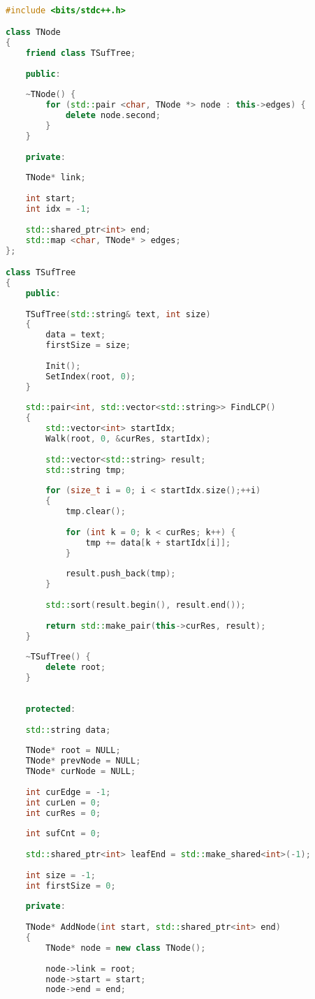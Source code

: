 \begin{lstlisting}[language=C++]

#include <bits/stdc++.h>

class TNode 
{
	friend class TSufTree;
	
	public:
	
	~TNode() {
		for (std::pair <char, TNode *> node : this->edges) {
			delete node.second;
		}
	}
	
	private:
	
	TNode* link;
	
	int start;
	int idx = -1;
	
	std::shared_ptr<int> end;
	std::map <char, TNode* > edges;
};

class TSufTree 
{
	public:
	
	TSufTree(std::string& text, int size) 
	{
		data = text;
		firstSize = size;
		
		Init();
		SetIndex(root, 0);
	}
	
	std::pair<int, std::vector<std::string>> FindLCP()
	{
		std::vector<int> startIdx;
		Walk(root, 0, &curRes, startIdx);
		
		std::vector<std::string> result;
		std::string tmp;
		
		for (size_t i = 0; i < startIdx.size();++i) 
		{
			tmp.clear();
			
			for (int k = 0; k < curRes; k++) {
				tmp += data[k + startIdx[i]];
			}
			
			result.push_back(tmp);
		}
		
		std::sort(result.begin(), result.end());
		
		return std::make_pair(this->curRes, result);
	}
	
	~TSufTree() {
		delete root;
	}
	
	
	protected:
	
	std::string data;
	
	TNode* root = NULL;
	TNode* prevNode = NULL;
	TNode* curNode = NULL;
	
	int curEdge = -1;
	int curLen = 0;
	int curRes = 0; 
	
	int sufCnt = 0;
	
	std::shared_ptr<int> leafEnd = std::make_shared<int>(-1);
	
	int size = -1; 
	int firstSize = 0;
	
	private:
	
	TNode* AddNode(int start, std::shared_ptr<int> end) 
	{
		TNode* node = new class TNode();
		
		node->link = root;
		node->start = start;
		node->end = end;
		

\end{lstlisting}
